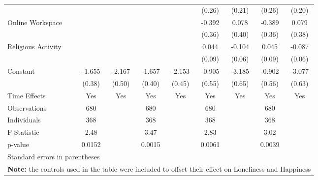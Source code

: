\begin{table}[htbp]
\begin{tabular}{l*{8}{c}}
                              &              &              &              &              &(0.26)         &(0.21)         &(0.26)         &(0.20)         \\
\hspace{0.25cm} Online Workspace&              &              &              &              &-0.392         &0.078         &-0.389         &0.079         \\
                              &              &              &              &              &(0.36)         &(0.40)         &(0.36)         &(0.38)         \\
\hspace{0.25cm} Religious Activity&              &              &              &              &0.044         &-0.104         &0.045         &-0.087         \\
                              &              &              &              &              &(0.09)         &(0.06)         &(0.09)         &(0.06)         \\
Constant                      &-1.655\sym{***}&-2.167\sym{***}&-1.657\sym{***}&-2.153\sym{***}&-0.905         &-3.185\sym{***}&-0.902         &-3.077\sym{***}\\
                              &(0.38)         &(0.50)         &(0.40)         &(0.45)         &(0.55)         &(0.65)         &(0.56)         &(0.63)         \\
Time Effects                  &  Yes         &  Yes         &  Yes         &  Yes         &  Yes         &  Yes         &  Yes         &  Yes         \\
\midrule
Observations                  &  680         &              &  680         &              &  680         &              &  680         &              \\
Individuals                   &  368         &              &  368         &              &  368         &              &  368         &              \\
F-Statistic                   & 2.48         &              & 3.47         &              & 2.83         &              & 3.02         &              \\
p-value                       &0.0152         &              &0.0015         &              &0.0061         &              &0.0039         &              \\
\bottomrule
\multicolumn{9}{l}{\footnotesize Standard errors in parentheses}\\
\multicolumn{9}{l}{\footnotesize \textbf{Note:} the controls used in the table were included to offset their effect on Loneliness and Happiness}\\

\end{tabular}
\end{table}
